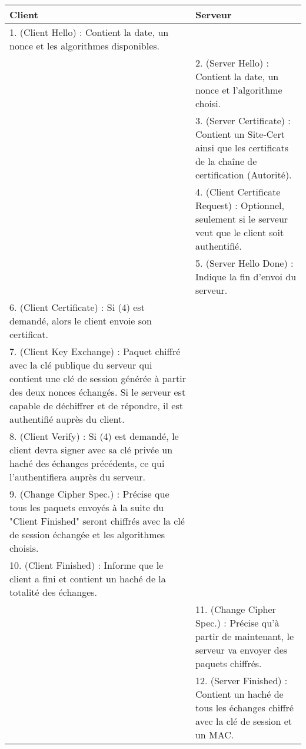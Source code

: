 \begin{tabular}{|m{8cm}|m{8cm}|}
   \hline
  \rowcolor[gray]{.8} Client & Serveur \\
   \hline
1. (Client Hello) : Contient la date, un nonce et les algorithmes disponibles. & \\
   \hline
&2. (Server Hello) : Contient la date, un nonce et l'algorithme choisi.\\
   \hline
& 3. (Server Certificate) :  Contient un Site-Cert ainsi que les certificats de la chaîne de certification (Autorité).\\
   \hline
& 4. (Client Certificate Request) : Optionnel, seulement si le serveur veut que le client soit authentifié.\\
   \hline
& 5. (Server Hello Done) : Indique la fin d'envoi du serveur.\\
   \hline
6. (Client Certificate) : Si (4) est demandé, alors le client envoie son certificat. & \\
   \hline
7. (Client Key Exchange) : Paquet chiffré avec la clé publique du serveur qui contient une clé de session générée à partir des deux nonces échangés. Si le serveur est capable de déchiffrer et de répondre, il est authentifié auprès du client. & \\
   \hline
8. (Client Verify) : Si (4) est demandé, le client devra signer avec sa clé privée un haché des échanges précédents, ce qui l'authentifiera auprès du serveur. & \\
   \hline
9. (Change Cipher Spec.) : Précise que tous les paquets envoyés à la suite du "Client Finished" seront chiffrés avec la clé de session échangée et les algorithmes choisis. & \\
   \hline
10. (Client Finished) : Informe que le client a fini et contient un haché de la totalité des échanges. & \\
   \hline
& 11. (Change Cipher Spec.) : Précise qu'à partir de maintenant, le serveur va envoyer des paquets chiffrés. \\
   \hline
& 12. (Server Finished) : Contient un haché de tous les échanges chiffré avec la clé de session et un MAC.\\
   \hline
\end{tabular}
